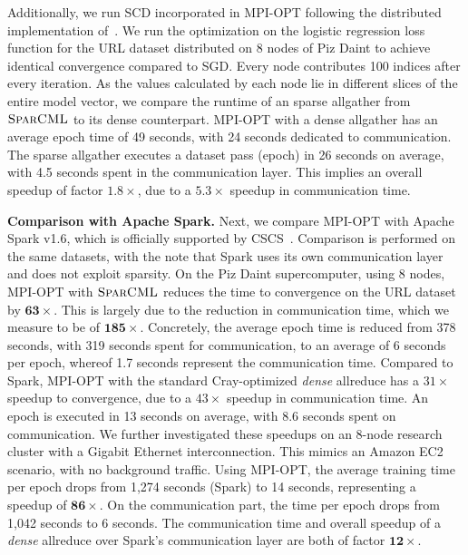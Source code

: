 \documentclass[11pt]{article}
\renewcommand{\paragraph}[1]{\vspace{0.1em} \noindent \textbf{#1}}
\newcommand{\mml}{$\textsc{SparCML}$}
\begin{document}
Additionally, we run SCD incorporated in
MPI-OPT following the distributed implementation
of~\cite{liu2015asynchronous}. We run the optimization on the logistic
regression loss function for the URL dataset distributed on 8 nodes of
Piz Daint to achieve identical convergence compared to SGD. Every node
contributes 100 indices after every iteration. As the values calculated
by each node lie in different slices of the entire model vector, we
compare the runtime of an sparse allgather from \mml{} to its dense
counterpart. MPI-OPT with a dense allgather has an average epoch time of 49 seconds, with 24 seconds dedicated to communication. The sparse allgather executes a dataset pass (epoch) in 26 seconds on average, with 4.5 seconds spent in the communication layer. This implies an overall speedup of factor $\bm{1.8}\times$, due to a $\bm{5.3}\times$ speedup in communication time.


\paragraph{Comparison with Apache Spark.} Next, we compare MPI-OPT with Apache Spark v1.6, which is officially supported by CSCS~\cite{CSCSSpark}.  Comparison is performed on the same datasets, with the note that Spark uses its own communication layer and does not exploit sparsity. 
On the Piz Daint supercomputer, using $8$ nodes, MPI-OPT with \mml{} reduces the time to convergence on the URL dataset by $\bm{63\times}$.
This is largely due to the reduction in communication time, which we measure to be of $\bm{185\times}$. Concretely, the average epoch time is reduced from 378 seconds, with 319 seconds spent for communication, to an average of 6 seconds per epoch, whereof 1.7 seconds represent the communication time.
Compared to Spark, MPI-OPT with the standard Cray-optimized \emph{dense} allreduce has a $31\times$ speedup to convergence, due to a $43\times$ speedup in communication time. An epoch is executed in 13 seconds on average, with 8.6 seconds spent on communication. We further investigated these speedups on an 8-node research cluster
with a Gigabit Ethernet interconnection. This mimics an Amazon EC2 scenario, with no background traffic. Using MPI-OPT, the average
training time per epoch drops from 1,274 seconds (Spark) to 14 seconds,
representing a speedup of $\bm{86\times}$. On the communication part,
the time per epoch drops from 1,042 seconds to 6 seconds. The communication time and
overall speedup of a \emph{dense} allreduce over Spark's communication layer are both of factor {$\bm{12\times}$}.
\end{document}
